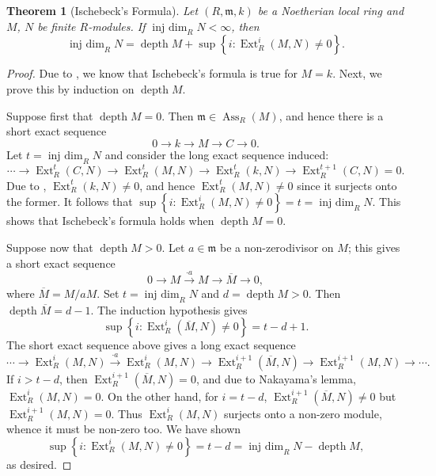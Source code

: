 \documentclass[10pt]{article}
\theoremstyle{thmstyle}
\newtheorem{theorem}{Theorem}[section]
\theoremstyle{defstyle}
\newcommand{\frakm}{\mathfrak{m}} %
\newcommand{\Ext}{\operatorname{Ext}}
\newcommand{\Ass}{\operatorname{Ass}}
\newcommand{\injdim}{\operatorname{inj~dim}}
\newcommand{\depth}{\operatorname{depth}}
\begin{document}
\begin{theorem}[Ischebeck's Formula]
    Let $(R,\frakm, k)$ be a Noetherian local ring and $M$, $N$ be finite $R$-modules. If $\injdim_R N < \infty$, then 
    \begin{equation*}
        \injdim_R N = \depth M + \sup\left\{i\colon\Ext^i_R(M, N)\ne 0\right\}.
    \end{equation*}
\end{theorem}
\begin{proof}
    Due to , we know that Ischebeck's formula is true for $M = k$. Next, we prove this by induction on $\depth M$.

    Suppose first that $\depth M = 0$. Then $\frakm\in\Ass_R(M)$, and hence there is a short exact sequence
    \begin{equation*}
        0\longrightarrow k\longrightarrow M\longrightarrow C\longrightarrow 0.
    \end{equation*}
    Let $t = \injdim_R N$ and consider the long exact sequence induced:
    \begin{equation*}
        \cdots\to\Ext^t_R(C, N)\to\Ext^t_R(M, N)\to\Ext^t_R(k, N)\to \Ext^{t + 1}_R(C, N) = 0.
    \end{equation*}
    Due to , $\Ext^t_R(k, N)\ne 0$, and hence $\Ext^t_R(M, N)\ne 0$ since it surjects onto the former. It follows that $\sup\left\{i\colon\Ext^i_R(M, N)\ne 0\right\} = t = \injdim_R N$. This shows that Ischebeck's formula holds when $\depth M = 0$. 

    Suppose now that $\depth M > 0$. Let $a\in\frakm$ be a non-zerodivisor on $M$; this gives a short exact sequence 
    \begin{equation*}
        0\to M\xrightarrow{\cdot a} M\to\overline M\to 0,
    \end{equation*}
    where $\overline M = M/aM$. Set $t = \injdim_R N$ and $d = \depth M > 0$. Then $\depth\overline M = d - 1$. The induction hypothesis gives 
    \begin{equation*}
        \sup\left\{i\colon\Ext^i_R(\overline M, N)\ne 0\right\} = t - d + 1.
    \end{equation*}
    The short exact sequence above gives a long exact sequence
    \begin{equation*}
        \cdots\to\Ext^i_R(M, N)\xrightarrow{\cdot a}\Ext^i_R(M, N)\to\Ext^{i + 1}_R(\overline M, N)\to\Ext^{i + 1}_R(M, N)\to\cdots.
    \end{equation*}
    If $i > t - d$, then $\Ext^{i + 1}_R(\overline M, N) = 0$, and due to Nakayama's lemma, $\Ext^i_R(M, N) = 0$. On the other hand, for $i = t -d$, $\Ext^{i + 1}_R(\overline M, N)\ne 0$ but $\Ext^{i + 1}_R(M, N) = 0$. Thus $\Ext^i_R(M, N)$ surjects onto a non-zero module, whence it must be non-zero too. We have shown 
    \begin{equation*}
        \sup\left\{i\colon\Ext^i_R(M, N)\ne 0\right\} = t - d = \injdim_R N - \depth M, 
    \end{equation*}
    as desired.
\end{proof}
\end{document}
